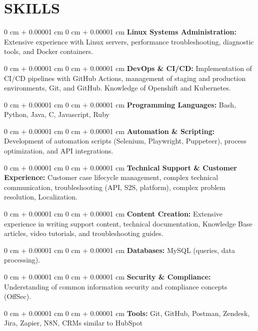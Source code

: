 \documentclass[10pt, letterpaper]{article}
\newenvironment{onecolentry}{
    \begin{adjustwidth}{
        0 cm + 0.00001 cm
    }{
        0 cm + 0.00001 cm
    }
}{
    \end{adjustwidth}
}
\begin{document}
\section{SKILLS}
\begin{onecolentry}{\textbf{Linux Systems Administration:} Extensive experience with Linux servers, performance troubleshooting, diagnostic tools, and Docker containers.}\end{onecolentry}
\vspace{0.1cm}
\begin{onecolentry}{\textbf{DevOps \& CI/CD:} Implementation of CI/CD pipelines with GitHub Actions, management of staging and production environments, Git, and GitHub. Knowledge of Openshift and Kubernetes.}\end{onecolentry}
\vspace{0.1cm}
\begin{onecolentry}{\textbf{Programming Languages:} Bash, Python, Java, C, Javascript, Ruby}\end{onecolentry}
\vspace{0.1cm}
\begin{onecolentry}{\textbf{Automation \& Scripting:} Development of automation scripts (Selenium, Playwright, Puppeteer), process optimization, and API integrations.}\end{onecolentry}
\vspace{0.1cm}
\begin{onecolentry}{\textbf{Technical Support \& Customer Experience:} Customer case lifecycle management, complex technical communication, troubleshooting (API, S2S, platform), complex problem resolution, Localization.}\end{onecolentry}
\vspace{0.1cm}
\begin{onecolentry}{\textbf{Content Creation:} Extensive experience in writing support content, technical documentation, Knowledge Base articles, video tutorials, and troubleshooting guides.}\end{onecolentry}
\vspace{0.1cm}
\begin{onecolentry}{\textbf{Databases:} MySQL (queries, data processing).}\end{onecolentry}
\vspace{0.1cm}
\begin{onecolentry}{\textbf{Security \& Compliance:} Understanding of common information security and compliance concepts (OffSec).}\end{onecolentry}
\vspace{0.1cm}
\begin{onecolentry}{\textbf{Tools:} Git, GitHub, Postman, Zendesk, Jira, Zapier, N8N, CRMs similar to HubSpot}\end{onecolentry}
\end{document}

